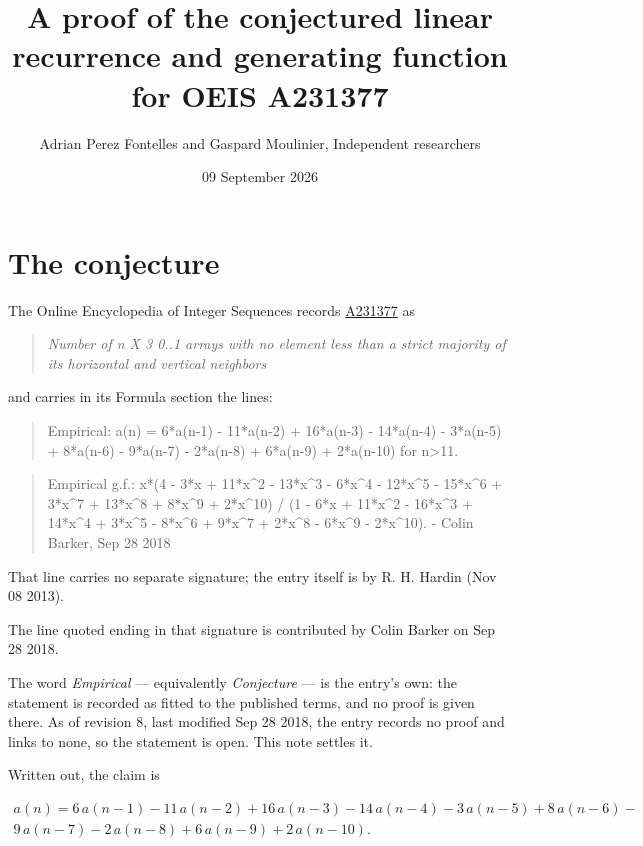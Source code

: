 \documentclass[11pt]{article}
\title{A proof of the conjectured linear recurrence and generating function for OEIS A231377}
\author{Adrian Perez Fontelles and Gaspard Moulinier, Independent researchers}
\date{09 September 2026}
\theoremstyle{definition}
\begin{document}
\maketitle
\section{The conjecture}

The Online Encyclopedia of Integer Sequences records \href{https://oeis.org/A231377}{A231377} as

\begin{quote}\itshape Number of n X 3 0..1 arrays with no element less than a strict majority of its horizontal and vertical neighbors\end{quote}

and carries in its Formula section the lines:

\begin{quote}\ttfamily Empirical: a(n) = 6*a(n-1) - 11*a(n-2) + 16*a(n-3) - 14*a(n-4) - 3*a(n-5) + 8*a(n-6) - 9*a(n-7) - 2*a(n-8) + 6*a(n-9) + 2*a(n-10) for n>11.\end{quote}

\begin{quote}\ttfamily Empirical g.f.: x*(4 - 3*x + 11*x\textasciicircum{}2 - 13*x\textasciicircum{}3 - 6*x\textasciicircum{}4 - 12*x\textasciicircum{}5 - 15*x\textasciicircum{}6 + 3*x\textasciicircum{}7 + 13*x\textasciicircum{}8 + 8*x\textasciicircum{}9 + 2*x\textasciicircum{}10) / (1 - 6*x + 11*x\textasciicircum{}2 - 16*x\textasciicircum{}3 + 14*x\textasciicircum{}4 + 3*x\textasciicircum{}5 - 8*x\textasciicircum{}6 + 9*x\textasciicircum{}7 + 2*x\textasciicircum{}8 - 6*x\textasciicircum{}9 - 2*x\textasciicircum{}10). - Colin Barker, Sep 28 2018\end{quote}

That line carries no separate signature; the entry itself is by R. H. Hardin (Nov 08 2013).

The line quoted ending in that signature is contributed by Colin Barker on Sep 28 2018.

The word {\itshape Empirical} --- equivalently {\itshape Conjecture} --- is the entry's own: the statement is recorded as fitted to the published terms, and no proof is given there. As of revision 8, last modified Sep 28 2018, the entry records no proof and links to none, so the statement is open. This note settles it.

Written out, the claim is

\begin{multline*} a(n) = 6\,a(n-1) - 11\,a(n-2) + 16\,a(n-3) - 14\,a(n-4) - 3\,a(n-5) + 8\,a(n-6) - \\ 9\,a(n-7) - 2\,a(n-8) + 6\,a(n-9) + 2\,a(n-10). \end{multline*}
\end{document}
